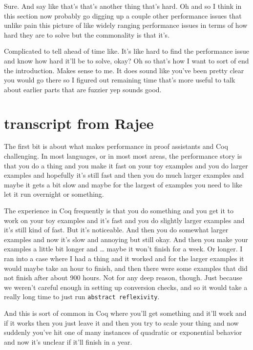 \begin{subappendices}
    Sure. And say like that's that's another thing that's hard. Oh and so I think in this section now probably go digging up a couple other performance issues that unlike pain this picture of like widely ranging performance issues in terms of how hard they are to solve but the commonality is that it's. 
    
    Complicated to tell ahead of time like. It's like hard to find the performance issue and know how hard it'll be to solve, okay? Oh so that's how I want to sort of end the introduction. Makes sense to me. It does sound like you've been pretty clear you would go there so I figured out remaining time that's more useful to talk about earlier parts that are fuzzier yep sounds good. 
    
    
    \section{transcript from Rajee}
The first bit is about what makes performance in proof assistants and Coq challenging. In most languages, or in most most areas, the performance story is that you do a thing and you make it fast on your toy examples and you do larger examples and hopefully it's still fast and then you do much larger examples and maybe it gets a bit slow and maybe for the largest of examples you need to like let it run overnight or something. 

The experience in Coq frequently is that you do something and you get it to work on your toy examples and it's fast and you do slightly larger examples and it's still kind of fast. But it's noticeable. And then you do somewhat larger examples and now it's slow and annoying but still okay.  And then you make your examples a little bit longer and \ldots{} maybe it won't finish for a week. Or longer.  I ran into a case where I had a thing and it worked and for the larger examples it would maybe take an hour to finish, and then there were some examples that did not finish after about 900 hours.  Not for any deep reason, though.  Just because we weren't careful enough in setting up conversion checks, and so it would take a really long time to just run \texttt{abstract reflexivity}.

And this is sort of common in Coq where you'll get something and it'll work and if it works then you just leave it and then you try to scale your thing and now suddenly you've hit one of many instances of quadratic or exponential behavior and now it's unclear if it'll finish in a year.


\end{subappendices}
